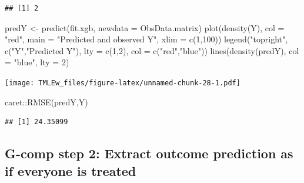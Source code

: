 \documentclass[
]{book}
\newenvironment{Shaded}{\begin{snugshade}}{\end{snugshade}}
\newcommand{\AttributeTok}[1]{\textcolor[rgb]{0.77,0.63,0.00}{#1}}
\newcommand{\DecValTok}[1]{\textcolor[rgb]{0.00,0.00,0.81}{#1}}
\newcommand{\FunctionTok}[1]{\textcolor[rgb]{0.00,0.00,0.00}{#1}}
\newcommand{\NormalTok}[1]{#1}
\newcommand{\OtherTok}[1]{\textcolor[rgb]{0.56,0.35,0.01}{#1}}
\newcommand{\SpecialCharTok}[1]{\textcolor[rgb]{0.00,0.00,0.00}{#1}}
\newcommand{\StringTok}[1]{\textcolor[rgb]{0.31,0.60,0.02}{#1}}
\begin{document}
\begin{verbatim}
## [1] 2
\end{verbatim}

\begin{Shaded}
\begin{Highlighting}[]
\NormalTok{predY }\OtherTok{\textless{}{-}} \FunctionTok{predict}\NormalTok{(fit.xgb, }\AttributeTok{newdata =}\NormalTok{ ObsData.matrix)}
\FunctionTok{plot}\NormalTok{(}\FunctionTok{density}\NormalTok{(Y), }
     \AttributeTok{col =} \StringTok{"red"}\NormalTok{, }
     \AttributeTok{main =} \StringTok{"Predicted and observed Y"}\NormalTok{,}
     \AttributeTok{xlim =} \FunctionTok{c}\NormalTok{(}\DecValTok{1}\NormalTok{,}\DecValTok{100}\NormalTok{))  }
\FunctionTok{legend}\NormalTok{(}\StringTok{"topright"}\NormalTok{, }
       \FunctionTok{c}\NormalTok{(}\StringTok{"Y"}\NormalTok{,}\StringTok{"Predicted Y"}\NormalTok{), }
       \AttributeTok{lty =} \FunctionTok{c}\NormalTok{(}\DecValTok{1}\NormalTok{,}\DecValTok{2}\NormalTok{), }
       \AttributeTok{col =} \FunctionTok{c}\NormalTok{(}\StringTok{"red"}\NormalTok{,}\StringTok{"blue"}\NormalTok{))}
\FunctionTok{lines}\NormalTok{(}\FunctionTok{density}\NormalTok{(predY), }\AttributeTok{col =} \StringTok{"blue"}\NormalTok{, }\AttributeTok{lty =} \DecValTok{2}\NormalTok{)}
\end{Highlighting}
\end{Shaded}

\texttt{[image: TMLEw\_files/figure-latex/unnamed-chunk-28-1.pdf]}

\begin{Shaded}
\begin{Highlighting}[]
\NormalTok{caret}\SpecialCharTok{::}\FunctionTok{RMSE}\NormalTok{(predY,Y)}
\end{Highlighting}
\end{Shaded}

\begin{verbatim}
## [1] 24.35099
\end{verbatim}

\hypertarget{g-comp-step-2-extract-outcome-prediction-as-if-everyone-is-treated}{%
\subsection{G-comp step 2: Extract outcome prediction as if everyone is treated}\label{g-comp-step-2-extract-outcome-prediction-as-if-everyone-is-treated}}

\begin{Shaded}
\end{Shaded}
\end{document}
